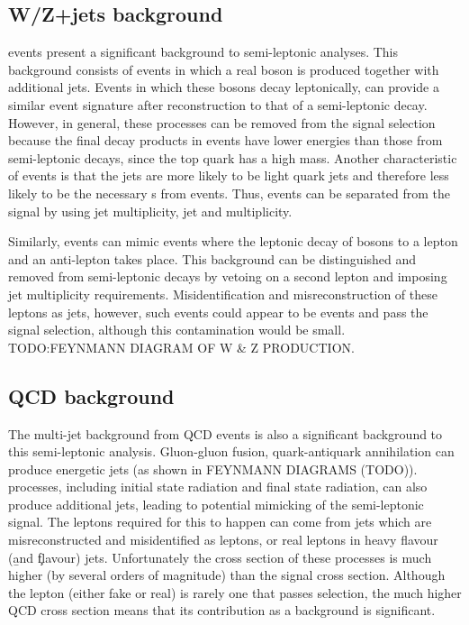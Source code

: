 \subsection{W/Z+jets background}
\label{ss:w_z_plus_jets}
\WpJets events present a significant background to semi-leptonic \ttbar analyses. This background
consists of events in which a real \W boson is produced together with additional jets. Events in which these
\W bosons decay leptonically, can provide a similar event signature after reconstruction to that of a
semi-leptonic \ttbar decay. However, in general, these processes can be removed from the signal selection
because the final decay products in \WpJets events have lower energies than those from semi-leptonic \ttbar
decays, since the top quark has a high mass. Another characteristic of \WpJets events is that the jets are
more likely to be light quark jets and therefore less likely to be the necessary \bjet s from \ttbar events.
Thus, \WpJets events can be separated from the \ttbar signal by using jet multiplicity, jet \pt and \bjet
multiplicity.

Similarly, \ZpJets events can mimic \ttbar events where the leptonic decay of \Z bosons to a lepton and an
anti-lepton takes place. This background can be distinguished and removed from semi-leptonic \ttbar decays by
vetoing on a second lepton and imposing jet multiplicity requirements. Misidentification and misreconstruction
of these leptons as jets, however, such events could appear to be \ttbar events and pass the signal selection,
although this contamination would be small. TODO:FEYNMANN DIAGRAM OF W \& Z PRODUCTION.

\subsection{QCD background}
\label{ss:qcd}
The multi-jet background from QCD events is also a significant background to this semi-leptonic \ttbar
analysis. Gluon-gluon fusion, quark-antiquark annihilation can produce energetic jets (as shown in FEYNMANN
DIAGRAMS (TODO)).%
processes, including initial state radiation and final state radiation, can also produce additional jets,
leading to potential mimicking of the semi-leptonic \ttbar signal. The leptons required for this to happen can
come from jets which are misreconstructed and misidentified as leptons, or real leptons in heavy flavour (\b
and \c flavour) jets. Unfortunately the cross section of these processes is much higher (by several orders of
magnitude) than the signal cross section. Although the lepton (either fake or real) is rarely one that passes
selection, the much higher QCD cross section means that its contribution as a background is significant.

